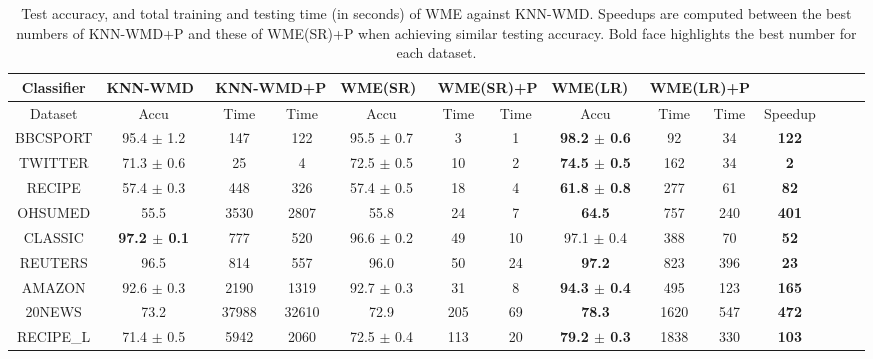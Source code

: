 \documentclass[11pt,a4paper]{article}
\newcommand{\1}{\boldsymbol{1}}
\begin{document}
\begin{table}[ht]
\centering
\scriptsize
\caption{Test accuracy, and total training and testing time (in seconds) of WME against KNN-WMD. Speedups are computed between the best numbers of KNN-WMD+P and these of WME(SR)+P when achieving similar testing accuracy. Bold face highlights the best number for each dataset.}
\vspace{0mm}
\label{tb:comp_wme_knn_runtime}
\newcommand{\Bd}[1]{\textbf{#1}}
\begin{center}
    \begin{tabular}{ c ccc ccc ccc ccc c}
    \hline
    \multicolumn{1}{c}{Classifier}
    & \multicolumn{3}{c}{KNN-WMD \ \ KNN-WMD+P}
    & \multicolumn{3}{c}{WME(SR) \ \ WME(SR)+P}
    & \multicolumn{3}{c}{WME(LR) \ \ WME(LR)+P} 
    & \multicolumn{1}{c}{}\\ \hline 
    \multicolumn{1}{c}{Dataset}
	& Accu & Time & Time & Accu & Time & Time & Accu & Time & Time & Speedup\\ \hline
    BBCSPORT  & 95.4 $\pm$ 1.2  & 147 & 122 & 95.5 $\pm$ 0.7 & 3 & 1 & \Bd{98.2 $\pm$ 0.6} & 92 & 34 & \Bd{122}\\ 
    TWITTER  & 71.3 $\pm$ 0.6 & 25 & 4 & 72.5 $\pm$ 0.5 & 10 & 2 & \Bd{74.5 $\pm$ 0.5} & 162 & 34 & \Bd{2}\\ 
    RECIPE  & 57.4 $\pm$ 0.3 & 448 & 326 & 57.4 $\pm$ 0.5 & 18 & 4 & \Bd{61.8 $\pm$ 0.8} & 277 & 61 & \Bd{82} \\ 
    OHSUMED  & 55.5 & 3530 & 2807 & 55.8 & 24 & 7 & \Bd{64.5} & 757 & 240 & \Bd{401} \\ 
    CLASSIC  & \Bd{97.2 $\pm$ 0.1} & 777 & 520 & 96.6 $\pm$ 0.2 & 49 & 10 & 97.1 $\pm$ 0.4 & 388 & 70 & \Bd{52}\\  
    REUTERS  & 96.5 & 814 & 557 & 96.0 & 50 & 24 & \Bd{97.2} & 823 & 396 & \Bd{23}\\ 
    AMAZON  & 92.6 $\pm$ 0.3 & 2190 & 1319 & 92.7 $\pm$ 0.3 & 31 & 8 & \Bd{94.3 $\pm$ 0.4} & 495 & 123 & \Bd{165}\\ 
    20NEWS  & 73.2 & 37988 & 32610 & 72.9 & 205 & 69 & \Bd{78.3} & 1620 & 547 & \Bd{472} \\ 
    RECIPE\_L  & 71.4 $\pm$ 0.5 & 5942 & 2060 & 72.5 $\pm$ 0.4 & 113 & 20 & \Bd{79.2 $\pm$ 0.3} & 1838 & 330 & \Bd{103} \\ \hline
    \end{tabular}
\end{center}
\vspace{0mm}
\end{table}
\end{document}
